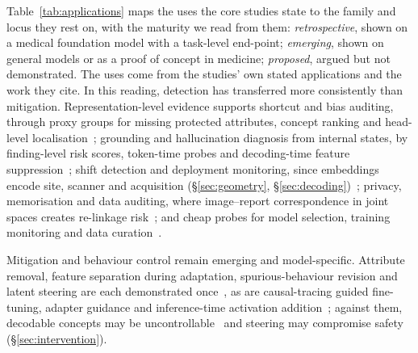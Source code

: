 Table~\ref{tab:applications} maps the uses the core studies state to the family and locus they rest on, with
the maturity we read from them: \emph{retrospective}, shown on a medical foundation model with a task-level
end-point; \emph{emerging}, shown on general models or as a proof of concept in medicine; \emph{proposed},
argued but not demonstrated. The uses come from the studies' own stated applications and the work they cite. In this reading, detection has transferred more consistently than mitigation. Representation-level evidence supports shortcut and
bias auditing, through proxy groups for missing protected attributes, concept ranking and head-level
localisation~\cite{queiroz2024using,bahre2025underdiagnosis,bhattacharyya2025conformal,yang2024demographic,brown2022detecting,yang2024the,janizek2026visual,yasser2026locating};
grounding and hallucination diagnosis from internal states, by finding-level risk scores, token-time probes
and decoding-time feature
suppression~\cite{hardy2024rextrust,yu2026realtime,nooralahzadeh2026universal,li2026suppressing,phukan2024beyond,li2025the,kossen2024semantic};
shift detection and deployment monitoring, since embeddings encode site, scanner and acquisition
(\S\ref{sec:geometry},
\S\ref{sec:decoding})~\cite{dejong2025current,mishra2025comparing,donle2026featmap,disalvo2026mars,poceviciute2024outofdistribution,schulthess2025anomaly,das2026proton};
privacy, memorisation and data auditing, where image--report correspondence in joint spaces creates
re-linkage
risk~\cite{tayebiarasteh2026crossmodal,tonekaboni2025an,deo2026a,hardan2025forgetmi,nasirigerdeh2024machine,zhang2026auditing,xu2026a};
and cheap probes for model selection, training monitoring and data
curation~\cite{liang2026cheap,chen2025revisiting}.

Mitigation and behaviour control remain emerging and model-specific. Attribute removal, feature separation
during adaptation, spurious-behaviour revision and latent steering are each demonstrated
once~\cite{zheng2025towards,huang2025knowledgeguided,pahde2025ensuring,ahsan2025can}, as are causal-tracing
guided fine-tuning, adapter guidance and inference-time activation
addition~\cite{abbasi2026layerspecific,sadanandan2026mechanistically,farina2026translating}; against them,
decodable concepts may be uncontrollable~\cite{basu2026interpretability} and steering may compromise
safety~\cite{korznikov2025the,li2026analysing} (\S\ref{sec:intervention}).

